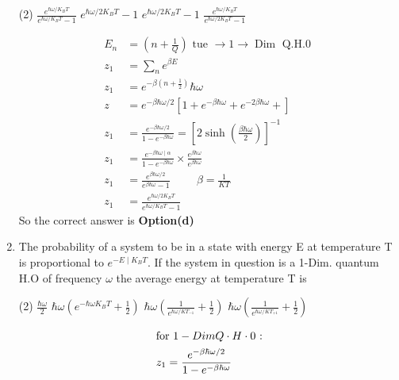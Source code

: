 \begin{enumerate}
\begin{tasks}(2)
	\task[\textbf{a.}]$\frac{e^{\hbar\omega/K_BT}}{e^{\hbar\omega/K_BT}-1}$
	\task[\textbf{b.}]$e^{\hbar \omega / 2 K_{B} T}-1$
	\task[\textbf{c.}]$e^{\hbar  \omega / 2 K_{B} T}-1$
	\task[\textbf{d.}] $\frac{e^{\hbar\omega/K_BT}}{e^{\hbar\omega/2K_BT}-1}$
\end{tasks}
\begin{answer}
	\begin{align*}
	E_{n}&=\left(n+\frac{1}{Q}\right) \text { tue } \rightarrow 1 \rightarrow \operatorname{Dim} \text { Q.H.0 }\\
	z_{1}&=\sum_{n} e^{\beta E}\\
	z_1&=e^{-\beta\left(n+\frac{1}{2} \right) }\hbar \omega\\
	z&=e^{-\beta \hbar \omega / 2}\left[1+e^{-\beta \hbar \omega}+e^{-2 \beta \hbar \omega}+\right]\\
	z_{1}&=\frac{e^{-\beta \hbar \omega / 2}}{1-e^{-\beta \hbar \omega}}=\left[2 \sinh \left(\frac{\beta \hbar \omega}{2}\right)\right]^{-1}\\
	z_{1}&=\frac{e^{-\beta \hbar \omega \mid \alpha}}{1-e^{-\beta \hbar \omega}} \times \frac{e^{\beta \hbar \omega}}{e^{\beta \hbar \omega}}\\
	z_{1}&=\frac{e^{\beta \hbar \omega / 2}}{e^{\beta \hbar \omega}-1}\hspace{1cm} \beta=\frac{1}{K T}\\
	z_{1}&=\frac{e^{\hbar \omega / 2 K_{B} T}}{e^{\hbar \omega / K_{B} T}-1}
	\end{align*}
	So the correct answer is \textbf{Option(d)}
\end{answer}
\item 	The probability of a system to be in a state with energy E at temperature T is proportional to $e^{-E \mid K_{B} T}$. If the system in question is a 1-Dim. quantum H.O of frequency $\omega$ the average energy at temperature T is
	\begin{tasks}(2)
		\task[\textbf{a.}]$\frac{\hbar\omega}{2}$
		\task[\textbf{b.}]$\hbar \omega\left(e^{-\hbar \omega K_{B} T}+\frac{1}{2}\right)$
		\task[\textbf{c.}]$\hbar \omega\left(\frac{1}{e^{\hbar\omega/KT_{-1}}}+\frac{1}{2}\right)$
		\task[\textbf{d.}] $\hbar \omega\left(\frac{1}{e^{\hbar\omega/KT_{+1}}}+\frac{1}{2}\right)$
	\end{tasks}
\begin{answer}
	\begin{align*}
	\intertext{for $1-Dim Q \cdot H \cdot 0$ :}
	z_{1}&=\frac{e^{-\beta \hbar \omega / 2}}{1-e^{-\beta \hbar \omega}}\\

\end{align*}
\end{answer}
\end{enumerate}
